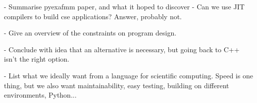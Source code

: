 - Summarise pyexafmm paper, and what it hoped to discover - Can we use JIT compilers to build cse applications? Answer, probably not.

- Give an overview of the constraints on program design.

- Conclude with idea that an alternative is necessary, but going back to C++ isn't the right option.

- List what we ideally want from a language for scientific computing. Speed is one thing, but we also want maintainability, easy testing, building on different environments, Python...

